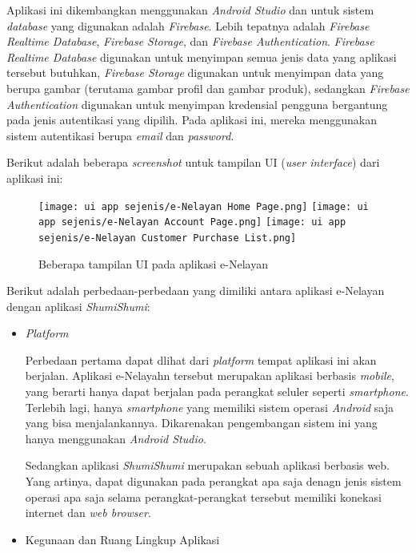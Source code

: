 \documentclass[a4paper]{article}
\begin{document}
\begin{enumerate}
    Aplikasi ini dikembangkan menggunakan \textit{Android Studio} dan untuk sistem \textit{database} yang digunakan adalah \textit{Firebase}. Lebih tepatnya adalah \textit{Firebase Realtime Database}, \textit{Firebase Storage}, dan \textit{Firebase Authentication}. \textit{Firebase Realtime Database} digunakan untuk menyimpan semua jenis data yang aplikasi tersebut butuhkan, \textit{Firebase Storage} digunakan untuk menyimpan data yang berupa gambar (terutama gambar profil dan gambar produk), sedangkan \textit{Firebase Authentication} digunakan untuk menyimpan kredensial pengguna bergantung pada jenis autentikasi yang dipilih. Pada aplikasi ini, mereka menggunakan sistem autentikasi berupa \textit{email} dan \textit{password}\autocite[1-10]{fishes-marketplace}.

    Berikut adalah beberapa \textit{screenshot} untuk tampilan UI (\textit{user interface}) dari aplikasi ini:
    \begin{figure}[h]
        \texttt{[image: ui app sejenis/e-Nelayan Home Page.png]}\hfill
        \texttt{[image: ui app sejenis/e-Nelayan Account Page.png]}\hfill
        \texttt{[image: ui app sejenis/e-Nelayan Customer Purchase List.png]}
        \caption{Beberapa tampilan UI pada aplikasi e-Nelayan}
    \end{figure}

    Berikut adalah perbedaan-perbedaan yang dimiliki antara aplikasi e-Nelayan dengan aplikasi \textit{ShumiShumi}:

    \begin{itemize}
        \item \textit{Platform}

        Perbedaan pertama dapat dlihat dari \textit{platform} tempat aplikasi ini akan berjalan. Aplikasi e-Nelayahn tersebut merupakan aplikasi berbasis \textit{mobile}, yang berarti hanya dapat berjalan pada perangkat seluler seperti \textit{smartphone}. Terlebih lagi, hanya \textit{smartphone} yang memiliki sistem operasi \textit{Android} saja yang bisa menjalankannya. Dikarenakan pengembangan sistem ini yang hanya menggunakan \textit{Android Studio}\autocite[1-10]{fishes-marketplace}.

        Sedangkan aplikasi \textit{ShumiShumi} merupakan sebuah aplikasi berbasis web. Yang artinya, dapat digunakan pada perangkat apa saja denagn jenis sistem operasi apa saja selama perangkat-perangkat tersebut memiliki konekasi internet dan \textit{web browser}.

        \item Kegunaan dan Ruang Lingkup Aplikasi


\end{itemize}
\end{enumerate}
\end{document}
